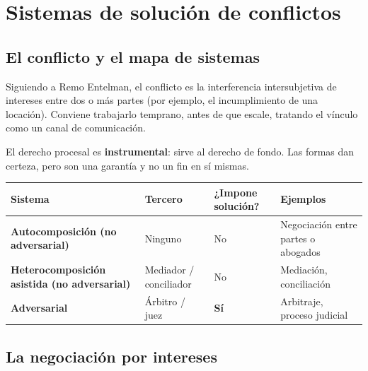 \chapter[Sistemas de solución de conflictos]{Sistemas de solución de conflictos}


\section{El conflicto y el mapa de sistemas}

Siguiendo a Remo Entelman, el conflicto es la interferencia intersubjetiva de intereses entre dos o más partes (por ejemplo, el incumplimiento de una locación). Conviene trabajarlo temprano, antes de que escale, tratando el vínculo como un canal de comunicación.

El derecho procesal es \textbf{instrumental}: sirve al derecho de fondo. Las formas dan certeza, pero son una garantía y no un fin en sí mismas.

\begin{center}
\begin{tabularx}{\textwidth}{>{\raggedright\arraybackslash}p{3.4cm} >{\raggedright\arraybackslash}p{2.6cm} >{\raggedright\arraybackslash}p{2.4cm} Y}
\toprule
\textbf{Sistema} & \textbf{Tercero} & \textbf{¿Impone solución?} & \textbf{Ejemplos} \\
\midrule
\textbf{Autocomposición (no adversarial)} & Ninguno & No & Negociación entre partes o abogados \\
\addlinespace
\textbf{Heterocomposición asistida (no adversarial)} & Mediador / conciliador & No & Mediación, conciliación \\
\addlinespace
\textbf{Adversarial} & Árbitro / juez & \textbf{Sí} & Arbitraje, proceso judicial \\
\bottomrule
\end{tabularx}
\end{center}

\section{La negociación por intereses}

